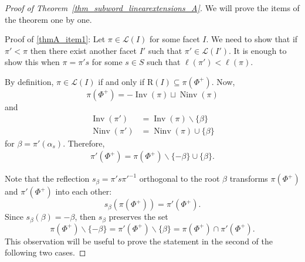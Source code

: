 \documentclass{amsart}
\theoremstyle{definition}
\DeclareMathOperator{\Inv}{Inv} %
\DeclareMathOperator{\Ninv}{Ninv} %
\newcommand{\linearExtensions}{\mathcal{L}} %
\newcommand{\Roots}{\mathrm{R}} %
\begin{document}
\begin{proof}[Proof of Theorem~\ref{thm_subword_linearextensions_A}]
We will prove the items of the theorem one by one.

Proof of \eqref{thmA_item1}:
Let $\pi\in \linearExtensions(I)$ for some facet $I$.
We need to show that if $\pi'<\pi$ then there exist another facet $I'$ such that $\pi'\in \linearExtensions(I')$. 
It is enough to show this when $\pi=\pi' s$ for some $s\in S$ such that $\ell(\pi'
)<\ell(\pi)$. 

By definition, $\pi\in \linearExtensions(I)$ if and only if $\Roots(I)\subseteq \pi(\Phi^+)$. Now, 
\[
\pi(\Phi^+)= -\Inv(\pi)\sqcup \Ninv(\pi)
\]  
and 
\begin{align*}
    \Inv(\pi') &=\Inv(\pi)\smallsetminus \{\beta\} \\
    \Ninv(\pi') &= \Ninv(\pi) \cup \{\beta\}
\end{align*}
for $\beta=\pi'(\alpha_s)$. 
Therefore,
\begin{align*}
    \pi'(\Phi^+) = \pi(\Phi^+) \smallsetminus \{-\beta\} \cup \{\beta\}.
\end{align*}

\begin{center}
%
\qquad
%
\end{center}
%
Note that the reflection $s_\beta=\pi's\pi'^{-1}$ orthogonal to the root $\beta$ transforms $\pi(\Phi^+)$ and $\pi'(\Phi^+)$ into each other:
\[
s_\beta(\pi(\Phi^+))=\pi'(\Phi^+).
\]
Since $s_\beta(\beta)= -\beta$, then $s_\beta$ preserves the set 
\[
\pi(\Phi^+)\smallsetminus \{-\beta\}=
\pi'(\Phi^+)\smallsetminus \{\beta\}=
\pi(\Phi^+)\cap \pi'(\Phi^+). 
\]
This observation will be useful to prove the statement in the second of the following two cases. 


\end{proof}
\end{document}
